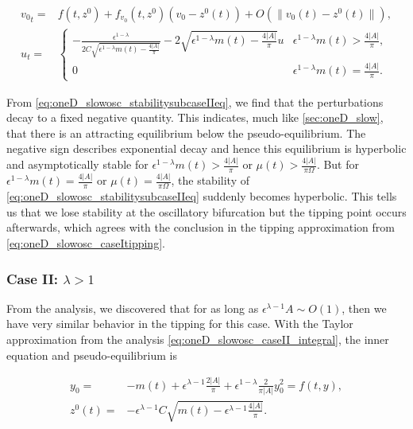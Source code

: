 \begin{equation}\label{eq:oneD_slowosc_stabilitysubcaseIIeq}
\begin{aligned}
{v_0}_t =& f(t,z^0)+f_{v_0}(t,z^0)(v_0-z^0(t))+O(\lVert v_0(t)-z^0(t) \rVert),\\
u_t =&\begin{cases}
-\frac{\epsilon^{1-\lambda}}{2C\sqrt{\epsilon^{1-\lambda}m(t)-\frac{4|A|}{\pi}}}-2\sqrt{\epsilon^{1-\lambda}m(t)-\frac{4|A|}{\pi}} u & \epsilon^{1-\lambda}m(t)>\frac{4|A|}{\pi},\\
0 & \epsilon^{1-\lambda}m(t)=\frac{4|A|}{\pi}.
\end{cases}
\end{aligned}
\end{equation}

From \eqref{eq:oneD_slowosc_stabilitysubcaseIIeq}, we find that the perturbations decay to a fixed negative quantity. This indicates, much like \autoref{sec:oneD_slow}, that there is an attracting equilibrium below the pseudo-equilibrium. The negative sign describes exponential decay and hence this equilibrium is hyperbolic and asymptotically stable for $\epsilon^{1-\lambda}m(t)>\frac{4|A|}{\pi}$ or $\mu(t)>\frac{4|A|}{\pi \Omega}$. But for $\epsilon^{1-\lambda}m(t)=\frac{4|A|}{\pi}$ or $\mu(t) =\frac{4|A|}{\pi \Omega}$, the stability of \eqref{eq:oneD_slowosc_stabilitysubcaseIIeq} suddenly becomes hyperbolic. This tells us that we lose stability at the oscillatory bifurcation but the tipping point occurs afterwards, which agrees with the conclusion in the tipping approximation from \eqref{eq:oneD_slowosc_caseItipping}.

\subsubsection{Case II: $\lambda>1$}

From the analysis, we discovered that for as long as $\epsilon^{\lambda-1}A\sim O(1)$, then we have very similar behavior in the tipping for this case. With the Taylor approximation from the analysis \eqref{eq:oneD_slowosc_caseII_integral}, the inner equation and pseudo-equilibrium is

\begin{equation}\label{eq:oneD_slowosc_stabilitycaseII}
\begin{aligned}
y_0=&-m(t) +\epsilon^{\lambda-1}\frac{2|A|}{\pi}+\epsilon^{1-\lambda}\frac{2}{\pi |A|}y_0^2=f(t,y),\\
z^0(t)=&-\epsilon^{\lambda-1}C\sqrt{m(t)-\epsilon^{\lambda-1}\frac{4|A|}{\pi}}.
\end{aligned}
\end{equation}

